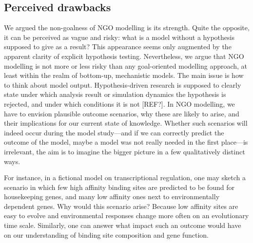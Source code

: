 \subsection{Perceived drawbacks}

We argued the non-goalness of NGO modelling is its strength. Quite the opposite, it can be perceived as vague and risky: what is a model without a hypothesis supposed to give as a result? This appearance seems only augmented by the apparent clarity of explicit hypothesis testing. Nevertheless, we argue that NGO modelling is not more or less risky than any goal-oriented modelling approach, at least within the realm of bottom-up, mechanistic models. The main issue is how to think about model output. Hypothesis-driven research is supposed to clearly state under which analysis result or simulation dynamics the hypothesis is rejected, and under which conditions it is not [REF?]. In NGO modelling, we have to envision plausible outcome scenarios, why these are likely to arise, and their implications for our current state of knowledge. Whether such scenarios will indeed occur during the model study---and if we can correctly predict the outcome of the model, maybe a model was not really needed in the first place---is irrelevant, the aim is to imagine the bigger picture in a few qualitatively distinct ways.

For instance, in a fictional model on transcriptional regulation, one may sketch a scenario in which few high affinity binding sites are predicted to be found for housekeeping genes, and many low affinity ones next to environmentally dependent genes. Why would this scenario arise? Because low affinity sites are easy to evolve and environmental responses change more often on an evolutionary time scale. Similarly, one can answer what impact such an outcome would have on our understanding of binding site composition and gene function.